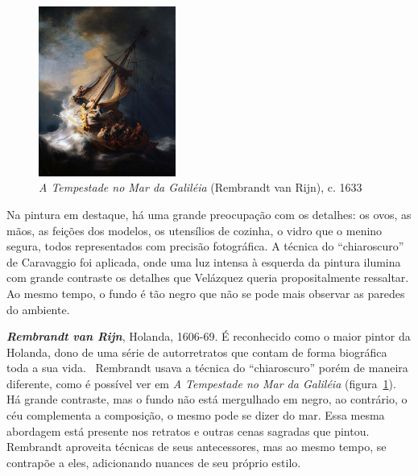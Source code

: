 \begin{figure}
  \vspace{-44pt}
  \begin{centering}
   \caption{\emph{A Tempestade no Mar da Galiléia} (Rembrandt van Rijn), c. 1633}
   \label{fig:rembrandt:tempestade}
    \includegraphics[width=0.4\textwidth]{figs/rembrandt_tempestade.png}
  \end{centering}
\end{figure}

Na pintura em destaque, há
uma grande preocupação com os detalhes: os ovos, as mãos, as feições
dos modelos, os utensílios de cozinha, o vidro que o menino segura,
todos representados com precisão fotográfica. A técnica do
``chiaroscuro'' de Caravaggio foi aplicada, onde uma luz intensa à
esquerda da pintura ilumina com grande contraste os detalhes que
Velázquez queria propositalmente ressaltar. Ao mesmo tempo, o fundo é
tão negro que não se pode mais observar as paredes do
ambiente.~\cite{gombrich}


\textbf{\emph{Rembrandt van Rijn}}, Holanda, 1606-69. É reconhecido
como o maior pintor da Holanda, dono de uma série de autorretratos que
contam de forma biográfica toda a sua vida.~\cite{van1999,
gombrich} Rembrandt usava a técnica do ``chiaroscuro'' porém de
maneira diferente, como é possível ver em \textit{A Tempestade no Mar
da Galiléia} (figura~\ref{fig:rembrandt:tempestade}). Há grande
contraste, mas o fundo não está mergulhado em negro, ao contrário, o
céu complementa a composição, o mesmo pode se dizer do mar. Essa mesma
abordagem está presente nos retratos e outras cenas sagradas que
pintou.~\cite{van1997} Rembrandt
aproveita técnicas de seus antecessores, mas ao mesmo tempo, se
contrapõe a eles, adicionando nuances de seu próprio estilo.

